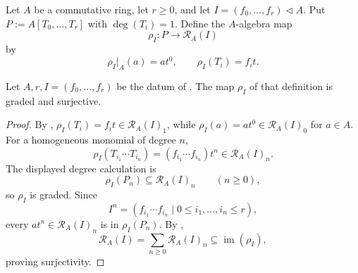 \begin{definition}
  \label{def:nagata-rees-polynomial-map}
  \lean{}

  Let $A$ be a commutative ring, let $r\geq0$, and let
  $I=(f_0,\ldots,f_r)\triangleleft A$.  Put
  $P:=A[T_0,\ldots,T_r]$ with
  $\deg(T_i)=1$.  Define the $A$-algebra map
  \[
    \rho_I\colon P\longrightarrow\mathcal R_A(I)
  \]
  by
  \[
    \rho_I|_A(a)=at^0,\qquad \rho_I(T_i)=f_it.
  \]
\end{definition}

\begin{lemma}
  \label{lemma:nagata-rees-polynomial-surjection}
  \lean{}

  Let $A,r,I=(f_0,\ldots,f_r)$ be the datum of
  .  The map $\rho_I$ of that
  definition is graded and surjective.
\end{lemma}

\begin{proof}
  By ,
  $\rho_I(T_i)=f_it\in\mathcal R_A(I)_1$, while
  $\rho_I(a)=at^0\in\mathcal R_A(I)_0$ for $a\in A$.  For a homogeneous
  monomial of degree $n$,
  \[
    \rho_I(T_{i_1}\cdots T_{i_n})
      =(f_{i_1}\cdots f_{i_n})t^n\in\mathcal R_A(I)_n.
  \]
  The displayed degree calculation is
  \[
    \rho_I(P_n)\subseteq\mathcal R_A(I)_n\qquad(n\geq0),
  \]
  so $\rho_I$ is graded.  Since
  \[
    I^n=(f_{i_1}\cdots f_{i_n}\mid
      0\le i_1,\ldots,i_n\le r),
  \]
  every $at^n\in\mathcal R_A(I)_n$ is in $\rho_I(P_n)$.  By
  ,
  \[
    \mathcal R_A(I)=\sum_{n\ge0}\mathcal R_A(I)_n
      \subseteq\operatorname{im}(\rho_I),
  \]
  proving surjectivity.
\end{proof}

